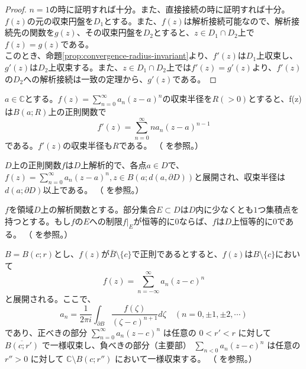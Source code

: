 \begin{proof}
    $n=1$の時に証明すれば十分。また、直接接続の時に証明すれば十分。\\
    $f(z)$の元の収束円盤を$D_{1}$とする。また、$f(z)$は解析接続可能なので、解析接続先の関数を$g(z)$、その収束円盤を$D_{2}$とすると、$z \in D_{1}\cap D_{2}$上で$f(z)=g(z)$である。\\
    このとき、命題\ref{prop:convergence-radius-invariant}より、$f'(z)はD_{1}$上収束し、$g'(z)はD_{2}$上収束する。また、$z \in D_{1}\cap D_{2}$上では$f'(z)=g'(z)$より、$f'(z)$の$D_{2}$への解析接続は一致の定理から、$g'(z)$である。
\end{proof}
\begin{proposition}[解析関数を微分しても収束半径は不変]\label{prop:convergence-radius-invariant}
    $a\in\mathbb{C}$とする。$f(z)=\sum_{n=0}^{\infty}a_{n}(z-a)^{n}$の収束半径を$R(>0)$とすると、f(z)は$B(a;R)$上の正則関数で
    \[
    f'(z)=\sum_{n=0}^{\infty}na_{n}(z-a)^{n-1}
    \]
    である。$f'(z)$の収束半径も$R$である。
    （\cite[p.62 定理3.1.10]{book:noguchi} を参照。）
\end{proposition}
\begin{theorem}[正則関数は解析関数]\label{thm:holomorphic-is-analytic}
    $D$上の正則関数$f$は$D$上解析的で、各点$a\in D$で、$f(z)=\sum_{n=0}^{\infty}a_{n}(z-a)^{n}, z\in B(a;d(a,\partial D))$と展開され、収束半径は$d(a;\partial D)$以上である。
    （\cite[p.89 定理3.5.7]{book:noguchi} を参照。）
\end{theorem}
\begin{proposition}[一致の定理]\label{prop:identity_theorem}
    $f$を領域$D$上の解析関数とする。部分集合$E\subset D$は$D$内に少なくとも$1$つ集積点を持つとする。もし$f$の$E$への制限$f|_{E}$が恒等的に$0$ならば、$f$は$D$上恒等的に$0$である。
    （\cite[p.35 定理2.4.14]{book:noguchi} を参照。）
\end{proposition}
\begin{theorem}[ローラン展開]\label{thm:laurent_expansion}
    $B=B(c;r)$とし、$f(z)$が$\bar{B}\setminus\{c\}$で正則であるとすると、$f(z)$は$B\setminus\{c\}$において
    \[
    f(z)=\sum_{n=-\infty}^{\infty}a_{n}(z-c)^{n}
    \]
    と展開される。ここで、
    \[
    a_{n}=\frac{1}{2\pi i}\int_{\partial B}\frac{f(\zeta)}{(\zeta-c)^{n+1}}d\zeta\quad (n=0,\pm1,\pm2,\cdots)
    \]
    であり、正べきの部分 $\sum_{n=0}^{\infty}a_{n}(z-c)^{n}$ は任意の $0<r'<r$ に対して $\overline{B(c;r')}$ で一様収束し、負べきの部分（主要部） $\sum_{n<0}a_{n}(z-c)^{n}$ は任意の $r''>0$ に対して $\mathbb{C}\setminus B(c;r'')$ において一様収束する。
    （\cite[p.70 定理14.1]{book:kimura} を参照。）
\end{theorem}


